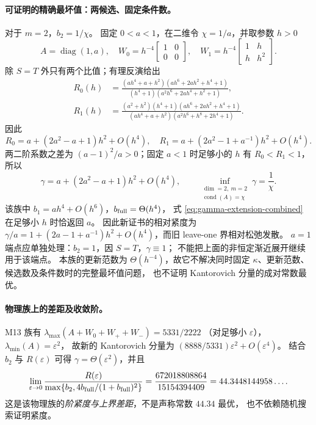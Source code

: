 \paragraph{可证明的精确最坏值：两候选、固定条件数。}
对于 $m=2$，$b_2=1/\chi$。
固定 $0<a<1$，在二维令 $\chi=1/a$，并取参数 $h>0$
\[
 A=\operatorname{diag}(1,a),\quad
 W_0=h^{-4}\begin{bmatrix}1&0\\0&0\end{bmatrix},\quad
 W_1=h^{-4}\begin{bmatrix}1&h\\h&h^2\end{bmatrix}.
\]
除 $S=T$ 外只有两个比值；有理反演给出
\begin{align}
 R_0(h)&=\frac{(ah^4+a+h^2)(ah^6+2ah^2+h^4+1)}
 {(h^4+1)(a^2h^6+2ah^4+h^2+1)},\\
 R_1(h)&=\frac{(a^2+h^2)(h^4+1)(ah^6+2ah^2+h^4+1)}
 {(ah^4+a+h^2)(a^2h^6+h^8+2h^4+1)}.
\end{align}
因此
\[
 R_0=a+(2a^2-a+1)h^2+O(h^4),\quad
 R_1=a+(2a^2-1+a^{-1})h^2+O(h^4).
\]
两二阶系数之差为 $(a-1)^2/a>0$；固定 $a<1$ 时足够小的 $h$
有 $R_0<R_1<1$，所以
\[
 \gamma=a+(2a^2-a+1)h^2+O(h^4),\qquad
 \inf_{\substack{\dim=2,\ m=2\\ \operatorname{cond}(A)=\chi}}\gamma=\frac1\chi.
\]
该族中 $b_1=ah^4+O(h^6)$，$b_{\rm full}=\Theta(h^4)$，
式 \eqref{eq:gamma-extension-combined} 在足够小 $h$ 时恰返回 $a$。
因此新证书的相对紧度为
$\gamma/a=1+(2a-1+a^{-1})h^2+O(h^4)$，而旧 leave-one 界相对松弛发散。
$a=1$ 端点应单独处理：$b_2=1$，因 $S=T$，$\gamma\equiv1$；
不能把上面的非恒定渐近展开继续用于该端点。
本族的更新范数为 $\Theta(h^{-4})$，故它不解决同时固定
$\kappa$、更新范数、候选数及条件数时的完整最坏值问题，
也不证明 Kantorovich 分量的成对常数最优。

\paragraph{物理族上的差距及收敛阶。}
M13 族有
$\lambda_{\max}(A+W_0+W_++W_-)=5331/2222$
（对足够小 $\varepsilon$），$\lambda_{\min}(A)=\varepsilon^2$，
故新的 Kantorovich 分量为
$(8888/5331)\varepsilon^2+O(\varepsilon^4)$。
结合 $b_2$ 与 $R(\varepsilon)$ 可得
$\gamma=\Theta(\varepsilon^2)$，并且
\[
 \lim_{\varepsilon\to0}\frac{R(\varepsilon)}{
  \max\{b_2,4b_{\rm full}/(1+b_{\rm full})^2\}}
 =\frac{672018808864}{15154394409}=44.3448144958\ldots .
\]
这是该物理族的\emph{阶紧度与上界差距}，不是声称常数 $44.34$ 最优，
也不依赖随机搜索证明紧度。

